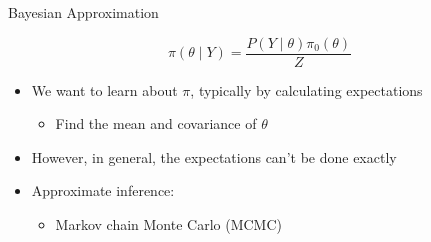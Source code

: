 \documentclass[10pt,xcolor=table]{beamer}
\begin{document}
\begin{frame}{Bayesian Approximation}
	
	\begin{equation*}
		\pi\left(\theta \mid Y \right)=\frac{P(Y \mid \theta) \pi_0(\theta)}{Z}
	\end{equation*}
	
		\begin{itemize}
				\item We want to learn about $\pi$, typically by calculating expectations
				\begin{itemize}
					\item Find the mean and covariance of $\theta$ \pause
				\end{itemize}
				\item However, in general, the expectations can’t be done exactly \pause
				\item Approximate inference: 
				\begin{itemize}
				\item Markov chain Monte Carlo (MCMC) 
				\end{itemize}
			\end{itemize}
\end{frame}
\end{document}
